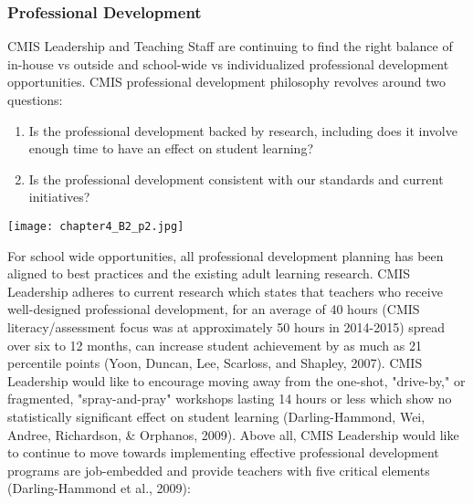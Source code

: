 \subsubsection{Professional Development}



\begin{findings}
CMIS Leadership and Teaching Staff are continuing to find the right balance of in-house vs outside and school-wide vs  individualized professional development opportunities. CMIS professional development philosophy revolves around two questions:

\begin{enumerate}
\item Is the professional development backed by research, including does it involve enough time to have an effect on student learning?
\item Is the professional development consistent with our standards and current initiatives? 
\end{enumerate}

{\centering\texttt{[image: chapter4\_B2\_p2.jpg]}}


For school wide opportunities, all professional development planning has been aligned to best practices and the existing adult learning research. CMIS Leadership adheres to current research which states that teachers who receive well-designed professional development, for an average of 40 hours (CMIS literacy/assessment focus was at approximately 50 hours in 2014-2015) spread over six to 12 months, can increase student achievement by as much as 21 percentile points (Yoon, Duncan, Lee, Scarloss, and Shapley, 2007). CMIS Leadership would like to encourage moving away from the one-shot, "drive-by," or fragmented, "spray-and-pray" workshops lasting 14 hours or less which show no statistically significant effect on student learning (Darling-Hammond, Wei, Andree, Richardson, \& Orphanos, 2009). Above all, CMIS Leadership would like to continue to move towards implementing effective professional development programs are job-embedded and provide teachers with five critical elements (Darling-Hammond et al., 2009):


\end{findings}
